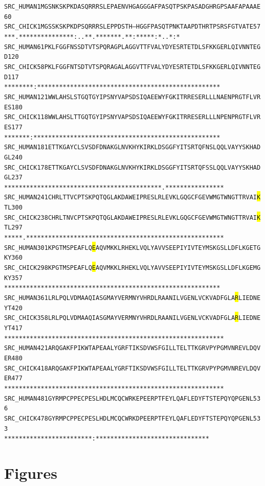 \documentclass[aps,pre,twocolumn,nofootinbib,superscriptaddress,linenumbers]{revtex4-1}
\begin{document}
\begin{alltt}
SRC_HUMAN   1     MGSNKSKPKD ASQRRRSLEP AENVHGAGGG AFPASQTPSK PASADGHRGP SAAFAPAAAE    60
SRC_CHICK   1     MGSSKSKPKD PSQRRRSLEP PDSTH---HG GFPASQTPNK TAAPDTHRTP SRSFGTVATE    57
                  ***.******  *********  :..*    * .*******.*  *: * ** * * :*. .*:*  
SRC_HUMAN   61    PKLFGGFNSS DTVTSPQRAG PLAGGVTTFV ALYDYESRTE TDLSFKKGER LQIVNNTEGD   120
SRC_CHICK   58    PKLFGGFNTS DTVTSPQRAG ALAGGVTTFV ALYDYESRTE TDLSFKKGER LQIVNNTEGD   117
                  ********:* **********  ********* ********** ********** **********  
SRC_HUMAN   121   WWLAHSLSTG QTGYIPSNYV APSDSIQAEE WYFGKITRRE SERLLLNAEN PRGTFLVRES   180
SRC_CHICK   118   WWLAHSLTTG QTGYIPSNYV APSDSIQAEE WYFGKITRRE SERLLLNPEN PRGTFLVRES   177
                  *******:** ********** ********** ********** ******* ** **********  
SRC_HUMAN   181   ETTKGAYCLS VSDFDNAKGL NVKHYKIRKL DSGGFYITSR TQFNSLQQLV AYYSKHADGL   240
SRC_CHICK   178   ETTKGAYCLS VSDFDNAKGL NVKHYKIRKL DSGGFYITSR TQFSSLQQLV AYYSKHADGL   237
                  ********** ********** ********** ********** ***.****** **********  
SRC_HUMAN   241   CHRLTTVCPT SKPQTQGLAK DAWEIPRES{\color{red}L RLEVKLGQGC FGEVWMGTWN GTTRVAI{\setlength{\fboxsep}{0pt}\colorbox{yellow}{K}}TL}   300
SRC_CHICK   238   CHRLTNVCPT SKPQTQGLAK DAWEIPRES{\color{red}L RLEVKLGQGC FGEVWMGTWN GTTRVAI{\setlength{\fboxsep}{0pt}\colorbox{yellow}{K}}TL}   297
                  *****.**** ********** ********** ********** ********** **********  
SRC_HUMAN   301   {\color{red}KPGTMSPEAF LQ{\setlength{\fboxsep}{0pt}\colorbox{yellow}{E}}AQVMKKL RHEKLVQLYA VVSEEPIYIV TEYMSKGSLL DFLKGETGKY}   360
SRC_CHICK   298   {\color{red}KPGTMSPEAF LQ{\setlength{\fboxsep}{0pt}\colorbox{yellow}{E}}AQVMKKL RHEKLVQLYA VVSEEPIYIV TEYMSKGSLL DFLKGEMGKY}   357
                  ********** ********** ********** ********** ********** ****** ***  
SRC_HUMAN   361   {\color{red}LRLPQLVDMA AQIASGMAYV ERMNYVHRDL RAANILVGEN LVCKVADFGL A{\setlength{\fboxsep}{0pt}\colorbox{yellow}{R}}LIEDNEYT}   420
SRC_CHICK   358   {\color{red}LRLPQLVDMA AQIASGMAYV ERMNYVHRDL RAANILVGEN LVCKVADFGL A{\setlength{\fboxsep}{0pt}\colorbox{yellow}{R}}LIEDNEYT}   417
                  ********** ********** ********** ********** ********** **********  
SRC_HUMAN   421   {\color{red}ARQGAKFPIK WTAPEAALYG RFTIKSDVWS FGILLTELTT KGRVPYPGMV NREVLDQVER}   480
SRC_CHICK   418   {\color{red}ARQGAKFPIK WTAPEAALYG RFTIKSDVWS FGILLTELTT KGRVPYPGMV NREVLDQVER}   477
                  ********** ********** ********** ********** ********** **********  
SRC_HUMAN   481   {\color{red}GYRMPCPPEC PESLHDLMCQ CWRKEPEERP TFEYLQAFLE DYF}TSTEPQY QPGENL       536
SRC_CHICK   478   {\color{red}GYRMPCPPEC PESLHDLMCQ CWRKDPEERP TFEYLQAFLE DYF}TSTEPQY QPGENL       533
                  ********** ********** ****:***** ********** ********** ******
\end{alltt}

\section{Figures}
\end{document}
